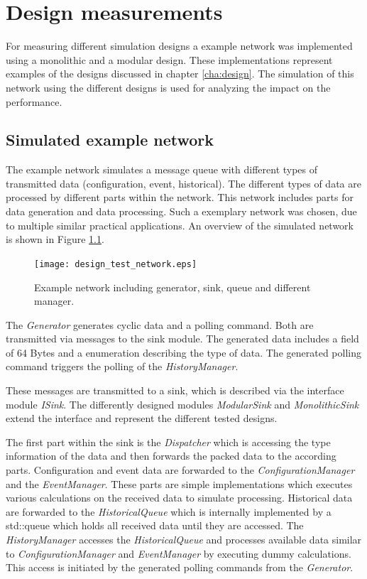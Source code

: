 \chapter{Design measurements}
\label{cha:measurements}
For measuring different simulation designs a example network was implemented using a monolithic and a modular design.
These implementations represent examples of the designs discussed in chapter \ref{cha:design}.
The simulation of this network using the different designs is used for analyzing the impact on the performance.


\section{Simulated example network}
\label{sec:measurements_network}
The example network simulates a message queue with different types of transmitted data (configuration, event, historical).
The different types of data are processed by different parts within the network.
This network includes parts for data generation and data processing.
Such a exemplary network was chosen, due to multiple similar practical applications.
An overview of the simulated network is shown in Figure \ref{fig:design_test_network}.

\begin{figure}
    \centering
    \texttt{[image: design\_test\_network.eps]}
    \caption{Example network including generator, sink, queue and different manager.}
    \label{fig:design_test_network}
\end{figure}

The \emph{Generator} generates cyclic data and a polling command.
Both are transmitted via messages to the sink module.
The generated data includes a field of 64 Bytes and a enumeration describing the type of data.
The generated polling command triggers the polling of the \emph{HistoryManager}.

These messages are transmitted to a sink, which is described via the interface module \emph{ISink}.
The differently designed modules \emph{ModularSink} and \emph{MonolithicSink} extend the interface and represent the different tested designs.

The first part within the sink is the \emph{Dispatcher} which is accessing the type information of the data and then forwards the packed data to the according parts.
Configuration and event data are forwarded to the \emph{ConfigurationManager} and the \emph{EventManager}.
These parts are simple implementations which executes various calculations on the received data to simulate processing.
Historical data are forwarded to the \emph{HistoricalQueue} which is internally implemented by a std::queue which holds all received data until they are accessed.
The \emph{HistoryManager} accesses the \emph{HistoricalQueue} and processes available data similar to \emph{ConfigurationManager} and \emph{EventManager} by executing dummy calculations.
This access is initiated by the generated polling commands from the \emph{Generator}.
\\

